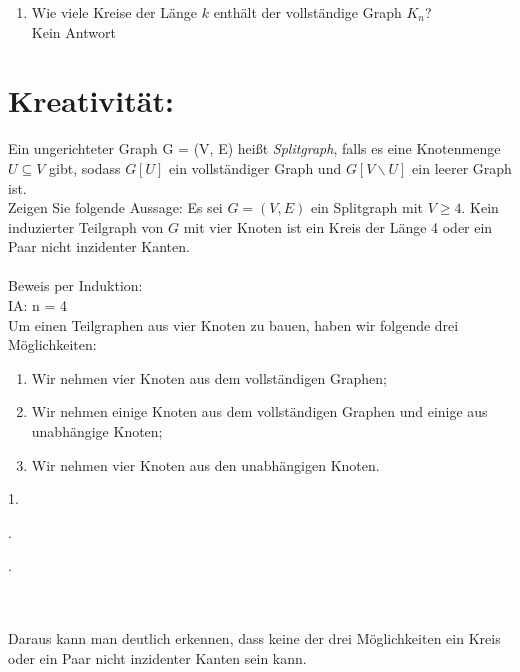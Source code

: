 \begin{enumerate}[label=(\alph*)]
        \item Wie viele Kreise der Länge $k$ enthält der vollständige Graph $K_n$? \\
        Kein Antwort
    \end{enumerate}
    \section*{Kreativität:}
    Ein ungerichteter Graph G = (V, E) heißt \textit{Splitgraph}, falls es eine Knotenmenge $U\subseteq V$ gibt,
	sodass $G[U]$ ein vollständiger Graph und $G[V\backslash U]$ ein leerer Graph ist.\\
	Zeigen Sie folgende Aussage:
	Es sei $G = (V, E)$ ein Splitgraph mit $V\geq 4$. Kein induzierter Teilgraph von $G$
	mit vier Knoten ist ein Kreis der Länge 4 oder ein Paar nicht inzidenter Kanten.\\ \\
	Beweis per Induktion: \\
	IA: n = 4 \\ 
	Um einen Teilgraphen aus vier Knoten zu bauen, haben wir folgende drei Möglichkeiten:
	\begin{enumerate}
		\item Wir nehmen vier Knoten aus dem vollständigen Graphen;
		\item Wir nehmen einige Knoten aus dem vollständigen Graphen und einige aus unabhängige Knoten;
		\item Wir nehmen vier Knoten aus den unabhängigen Knoten.
	\end{enumerate}
	1. 
    .
    .
    \\\\
    Daraus kann man deutlich erkennen, dass keine der drei Möglichkeiten ein Kreis oder ein Paar nicht inzidenter Kanten sein kann. 
    
